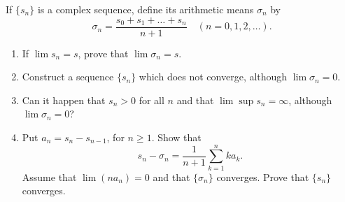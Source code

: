 \setcounter{problem}{13}
\begin{problem}
  If $\{s_n\}$ is a complex sequence, define its arithmetic means $\sigma_n$ by
  \[\sigma_n = \frac{s_0 + s_1 + \ldots + s_n}{n + 1} \quad (n = 0, 1, 2, \ldots).\]
  \begin{enumerate}[label=(\alph*)]
    \item If $\lim s_n = s$, prove that $\lim \sigma_n = s$.
    \item Construct a sequence $\{s_n\}$ which does not converge, although $\lim \sigma_n = 0$.
    \item Can it happen that $s_n > 0$ for all $n$ and that $\lim\sup s_n = \infty$, although $\lim \sigma_n = 0$?
    \item Put $a_n = s_n - s_{n-1}$, for $n \ge 1$.
      Show that
      \[s_n - \sigma_n = \frac{1}{n + 1} \sum_{k = 1}^{n} k a_k .\]
      Assume that $\lim (na_n) = 0$ and that $\{\sigma_n\}$ converges.
      Prove that $\{s_n\}$ converges.
  \end{enumerate}
\end{problem}

